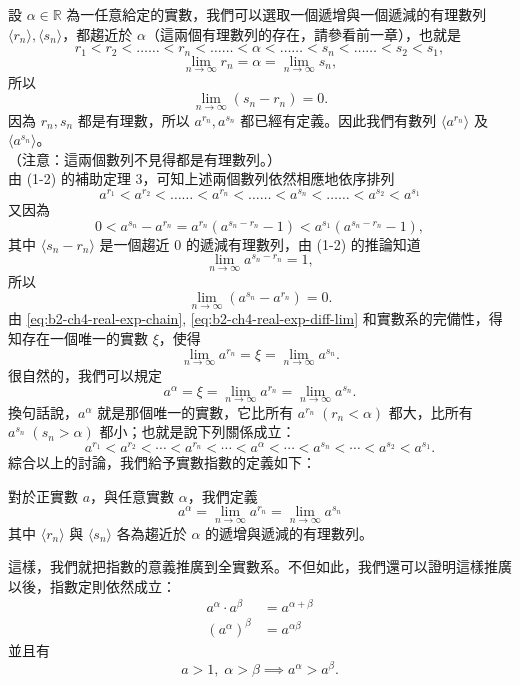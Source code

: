 設 $\alpha \in \mathbb{R}$ 為一任意給定的實數，我們可以選取一個遞增與一個遞減的有理數列 $\langle r_n \rangle, \langle s_n \rangle$，都趨近於 $\alpha$（這兩個有理數列的存在，請參看前一章），也就是
\[
r_1 < r_2 < \dots\dots < r_n < \dots\dots < \alpha < \dots\dots < s_n < \dots\dots < s_2 < s_1,
\]
\[
\lim_{n\to\infty} r_n = \alpha = \lim_{n\to\infty} s_n,
\]
所以
\[
\lim_{n\to\infty}(s_n - r_n) = 0.
\]
因為 $r_n, s_n$ 都是有理數，所以 $a^{r_n}, a^{s_n}$ 都已經有定義。因此我們有數列 $\langle a^{r_n} \rangle$ 及 $\langle a^{s_n} \rangle$。\\
（注意：這兩個數列不見得都是有理數列。）\\
由 (1-2) 的補助定理 3，可知上述兩個數列依然相應地依序排列
\begin{equation}
a^{r_1} < a^{r_2} < \dots\dots < a^{r_n} < \dots\dots < a^{s_n} < \dots\dots < a^{s_2} < a^{s_1} \label{eq:b2-ch4-real-exp-chain}
\end{equation}
又因為
\[
0 < a^{s_n} - a^{r_n} = a^{r_n}(a^{s_n - r_n} - 1) < a^{s_1}(a^{s_n - r_n} - 1),
\]
其中 $\langle s_n - r_n \rangle$ 是一個趨近 0 的遞減有理數列，由 (1-2) 的推論知道
\[
\lim_{n\to\infty} a^{s_n - r_n} = 1,
\]
所以
\begin{equation}
\lim_{n\to\infty}(a^{s_n} - a^{r_n}) = 0. \label{eq:b2-ch4-real-exp-diff-lim}
\end{equation}
由 \eqref{eq:b2-ch4-real-exp-chain}, \eqref{eq:b2-ch4-real-exp-diff-lim} 和實數系的完備性，得知存在一個唯一的實數 $\xi$，使得
\[
\lim_{n\to\infty} a^{r_n} = \xi = \lim_{n\to\infty} a^{s_n}.
\]
很自然的，我們可以規定
\[
a^\alpha = \xi = \lim_{n\to\infty} a^{r_n} = \lim_{n\to\infty} a^{s_n}.
\]
換句話說，$a^\alpha$ 就是那個唯一的實數，它比所有 $a^{r_n}\; (r_n < \alpha)$ 都大，比所有 $a^{s_n}\; (s_n > \alpha)$ 都小；也就是說下列關係成立：
\[
a^{r_1} < a^{r_2} < \cdots < a^{r_n} < \cdots < a^\alpha < \cdots < a^{s_n} < \cdots < a^{s_2} < a^{s_1}.
\]
綜合以上的討論，我們給予實數指數的定義如下：

\begin{definition*}
對於正實數 $a$，與任意實數 $\alpha$，我們定義
\[
a^\alpha = \lim_{n\to\infty} a^{r_n} = \lim_{n\to\infty} a^{s_n}
\]
其中 $\langle r_n \rangle$ 與 $\langle s_n \rangle$ 各為趨近於 $\alpha$ 的遞增與遞減的有理數列。
\end{definition*}

這樣，我們就把指數的意義推廣到全實數系。不但如此，我們還可以證明這樣推廣以後，指數定則依然成立：
\begin{align}
a^\alpha \cdot a^\beta &= a^{\alpha+\beta} \label{eq:b2-ch4-real-rule-1} \\
(a^\alpha)^\beta &= a^{\alpha\beta} \label{eq:b2-ch4-real-rule-2}
\end{align}
並且有
\[
a > 1,\; \alpha > \beta \implies a^\alpha > a^\beta.
\]

